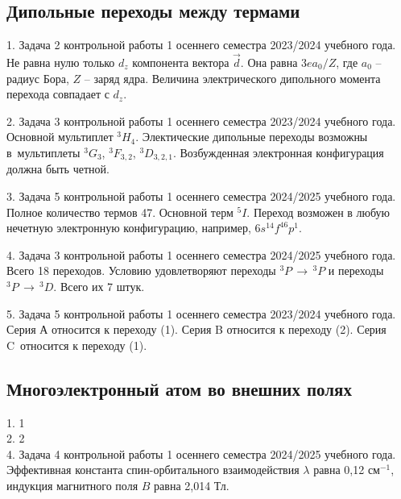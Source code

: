 \subsection{Дипольные переходы между термами}
1. Задача 2 контрольной работы 1 осеннего семестра 2023/2024 учебного года. Не равна нулю только $d_z$ компонента вектора $\vec d$. Она равна $3ea_0/Z$, где $a_0$ – радиус Бора, $Z$ – заряд ядра. Величина электрического дипольного момента перехода совпадает с $d_z$.\par
2. Задача 3 контрольной работы 1 осеннего семестра 2023/2024 учебного года. Основной мультиплет $^3H_4$. Электические дипольные переходы возможны в~мультиплеты $^3G_3$, $^3F_{3,2}$, $^3D_{3,2,1}$. Возбужденная электронная конфигурация должна быть четной.\par
3. Задача 5 контрольной работы 1 осеннего семестра 2024/2025 учебного года.  Полное количество термов 47. Основной терм $^5I$. Переход возможен в любую нечетную электронную конфигурацию, например, $6s^14f^46p^1$.\par
4. Задача 3 контрольной работы 1 осеннего семестра 2024/2025 учебного года. Всего 18 переходов. Условию удовлетворяют переходы $^3P\, \rightarrow\, ^3P$ и переходы $^3P\, \rightarrow\, ^3D$. Всего их 7 штук.\par
5. Задача 5 контрольной работы 1 осеннего семестра 2023/2024 учебного года. Серия А относится к переходу (1). Серия B относится к переходу (2). Серия C~относится к переходу (1).   \\
\newpage

\subsection{Многоэлектронный атом во внешних полях}
1. 1 \\
2. 2 \\
4. Задача 4 контрольной работы 1 осеннего семестра 2024/2025 учебного года. Эффективная константа спин-орбитального взаимодействия $\lambda$ равна 0,12 см$^{-1}$, индукция магнитного поля $B$ равна 2,014 Тл.\par
\newpage

